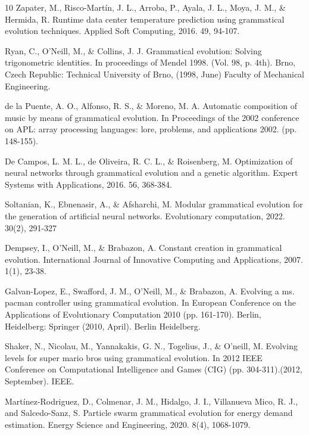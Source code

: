 \documentclass[12pt]{Definitions/academia}
\begin{document}
\begin{thebibliography}{10}
Zapater, M., Risco-Martín, J. L., Arroba, P.,
Ayala, J. L., Moya, J. M., \& Hermida, R. Runtime data center temperature
prediction using grammatical evolution techniques. Applied Soft Computing,
2016. 49, 94-107.

Ryan, C., O\textquoteright Neill, M., \& Collins,
J. J. Grammatical evolution: Solving trigonometric identities. In
proceedings of Mendel 1998. (Vol. 98, p. 4th). Brno, Czech Republic:
Technical University of Brno, (1998, June) Faculty of Mechanical Engineering.

de la Puente, A. O., Alfonso, R. S., \&
Moreno, M. A. Automatic composition of music by means of grammatical
evolution. In Proceedings of the 2002 conference on APL: array processing
languages: lore, problems, and applications 2002. (pp. 148-155).

De Campos, L. M. L., de Oliveira, R. C. L.,
\& Roisenberg, M. Optimization of neural networks through grammatical
evolution and a genetic algorithm. Expert Systems with Applications,
2016. 56, 368-384.

Soltanian, K., Ebnenasir, A., \& Afsharchi,
M. Modular grammatical evolution for the generation of artificial
neural networks. Evolutionary computation, 2022. 30(2), 291-327

Dempsey, I., O'Neill, M., \& Brabazon, A. Constant
creation in grammatical evolution. International Journal of Innovative
Computing and Applications, 2007. 1(1), 23-38.

Galvan-Lopez, E., Swafford,
J. M., O\textquoteright Neill, M., \& Brabazon, A. Evolving a ms.
pacman controller using grammatical evolution. In European Conference
on the Applications of Evolutionary Computation 2010 (pp. 161-170).
Berlin, Heidelberg: Springer (2010, April). Berlin Heidelberg.

Shaker, N., Nicolau, M., Yannakakis, G. N.,
Togelius, J., \& O'neill, M. Evolving levels for super mario bros
using grammatical evolution. In 2012 IEEE Conference on Computational
Intelligence and Games (CIG) (pp. 304-311).(2012, September). IEEE.

Martínez-Rodriguez,
D., Colmenar, J. M., Hidalgo, J. I., Villanueva Mico, R. J., and Salcedo-Sanz,
S. Particle swarm grammatical evolution for energy demand estimation.
Energy Science and Engineering, 2020. 8(4), 1068-1079.


\end{thebibliography}
\end{document}
